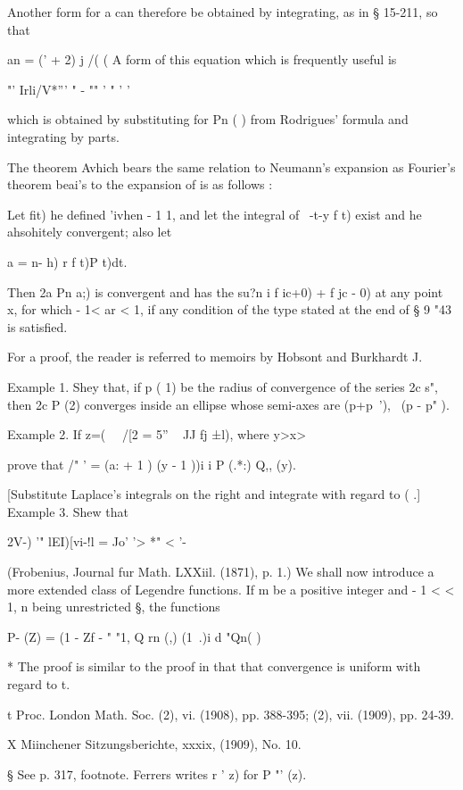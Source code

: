 {{{Another form for a can therefore be obtained by integrating, as in §
15-211, so that

an = (' + 2) j /( (  A form of this equation which is frequently
useful is

"' Irli/V*''' " - "" ' " ' '

which is obtained by substituting for Pn ( ) from Rodrigues' formula
and integrating by parts.

The theorem Avhich bears the same relation to Neumann's expansion as
Fourier's theorem beai's to the expansion of is as follows :

Let fit) he defined 'ivhen - 1 1, and let the integral of \ -t-y f t)
exist and he ahsohitely convergent; also let

a = n- h) r f t)P t)dt.

Then 2a Pn a;) is convergent and has the su?n i f ic+0) + f jc - 0) at
any point x, for which - 1< ar < 1, if any condition of the type
stated at the end of § 9 "43 is satisfied.

For a proof, the reader is referred to memoirs by Hobsont and
Burkhardt J.

Example 1. Shey that, if p ( 1) be the radius of convergence of the
series 2c s", then 2c P (2) converges inside an ellipse whose
semi-axes are (p+p~'), \ (p - p" ).

Example 2. If z=( \ \ /[2 = 5'' ~ JJ fj ±l), where y>x>\,

prove that /" ' = (a: + 1 ) (y - 1 ))i i P (.*:) Q,, (y).

[Substitute Laplace's integrals on the right and integrate with regard
to ( .] Example 3. Shew that

2V-) '" lEI)[vi-!l = Jo' '>  *" < '-

(Frobenius, Journal fur Math. LXXiil. (1871), p. 1.)
 We shall now
introduce a more extended class of Legendre functions. If m be a
positive integer and - 1 < < 1, n being unrestricted §, the functions

P- (Z) = (1 - Zf - " "1, Q rn (,) (1 \,.)i d "Qn( )

* The proof is similar to the proof in that that convergence is
uniform with regard to t.

t Proc. London Math. Soc. (2), vi. (1908), pp. 388-395; (2), vii.
(1909), pp. 24-39.

X Miinchener Sitzungsberichte, xxxix, (1909), No. 10.

§ See p. 317, footnote. Ferrers writes r ' z) for P "' (z).

}}}
